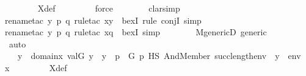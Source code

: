 \begin{isabellebody}
\ \ \ \ \ \ \isamarkupfalse%
\ X{\isacharunderscore}{\kern0pt}def\isanewline
\ \ \ \ \ \ \ \isamarkupfalse%
\ force\isanewline
\ \ \ \ \ \ \isamarkupfalse%
\ clarsimp\isanewline
\ \ \ \ \ \ \isamarkupfalse%
{\isacharparenleft}{\kern0pt}rename{\isacharunderscore}{\kern0pt}tac\ y{\isacharprime}{\kern0pt}\ p\ q{\isacharcomma}{\kern0pt}\ rule{\isacharunderscore}{\kern0pt}tac\ x{\isacharequal}{\kern0pt}y{\isacharprime}{\kern0pt}\ \ bexI{\isacharcomma}{\kern0pt}\ rule\ conjI{\isacharcomma}{\kern0pt}\ simp{\isacharparenright}{\kern0pt}\isanewline
\ \ \ \ \ \ \ \isamarkupfalse%
{\isacharparenleft}{\kern0pt}rename{\isacharunderscore}{\kern0pt}tac\ y{\isacharprime}{\kern0pt}\ p\ q{\isacharcomma}{\kern0pt}\ rule{\isacharunderscore}{\kern0pt}tac\ x{\isacharequal}{\kern0pt}q\ \ bexI{\isacharcomma}{\kern0pt}\ simp{\isacharparenright}{\kern0pt}\isanewline
\ \ \ \ \ \ \isamarkupfalse%
\ M{\isacharunderscore}{\kern0pt}genericD\ generic\ \isanewline
\ \ \ \ \ \ \isamarkupfalse%
\ auto\isanewline
\ \ \ \ \isamarkupfalse%
\ \isamarkupfalse%
\ {\isachardoublequoteopen}{\isachardot}{\kern0pt}{\isachardot}{\kern0pt}{\isachardot}{\kern0pt}\ {\isasymlongleftrightarrow}\ {\isacharparenleft}{\kern0pt}{\isasymexists}y{\isacharprime}{\kern0pt}\ {\isasymin}\ domain{\isacharparenleft}{\kern0pt}x{\isacharprime}{\kern0pt}{\isacharparenright}{\kern0pt}{\isachardot}{\kern0pt}\ val{\isacharparenleft}{\kern0pt}G{\isacharcomma}{\kern0pt}\ y{\isacharprime}{\kern0pt}{\isacharparenright}{\kern0pt}\ {\isacharequal}{\kern0pt}\ y\ {\isasymand}\ {\isacharparenleft}{\kern0pt}{\isasymexists}p\ {\isasymin}\ G{\isachardot}{\kern0pt}\ p\ {\isasymtturnstile}HS\ And{\isacharparenleft}{\kern0pt}Member{\isacharparenleft}{\kern0pt}{}{\isacharcomma}{\kern0pt}\ succ{\isacharparenleft}{\kern0pt}length{\isacharparenleft}{\kern0pt}env{\isacharprime}{\kern0pt}{\isacharparenright}{\kern0pt}{\isacharparenright}{\kern0pt}{\isacharparenright}{\kern0pt}{\isacharcomma}{\kern0pt}\ {\isasymphi}{\isacharparenright}{\kern0pt}\ {\isacharbrackleft}{\kern0pt}y{\isacharprime}{\kern0pt}{\isacharbrackright}{\kern0pt}\ {\isacharat}{\kern0pt}\ env{\isacharprime}{\kern0pt}\ {\isacharat}{\kern0pt}\ {\isacharbrackleft}{\kern0pt}x{\isacharprime}{\kern0pt}{\isacharbrackright}{\kern0pt}{\isacharparenright}{\kern0pt}{\isacharparenright}{\kern0pt}{\isachardoublequoteclose}\ \isanewline
\ \ \ \ \ \ \isamarkupfalse%
\ X{\isacharunderscore}{\kern0pt}def\isanewline

\end{isabellebody}
